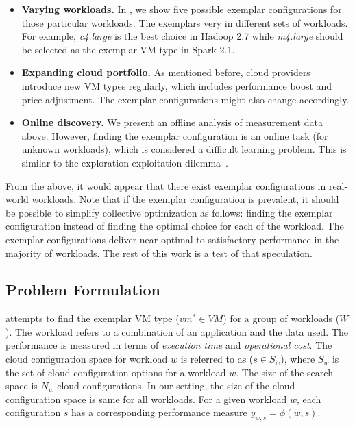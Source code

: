 \begin{itemize}
\item \textbf{Varying workloads.}
In \mytable{\ref{table:dataset}}, we show five possible exemplar configurations for those particular workloads.
The exemplars very in different sets of workloads.
For example, \emph{c4.large} is the best choice in Hadoop 2.7 while
\emph{m4.large} should be selected as the exemplar VM type in Spark 2.1.

\item \textbf{Expanding cloud portfolio.}
As mentioned before, cloud providers introduce new VM types regularly, which
includes performance boost and price adjustment.
The exemplar configurations might also change accordingly.

\item \textbf{Online discovery.}
We present an offline analysis of measurement data above.
However, finding the exemplar configuration is an online task (for unknown workloads), which is considered a difficult learning problem.
This is similar to the exploration-exploitation dilemma~\cite{kaelbling1996reinforcement}.

\end{itemize}

From the above, it would appear that there exist exemplar configurations in real-world workloads.
Note that if the exemplar configuration is prevalent, it should be possible to simplify collective optimization as follows:
finding the exemplar configuration instead of finding the optimal choice for each of the workload.
The exemplar configurations deliver near-optimal to satisfactory performance in the majority of workloads.
The rest of this work is a test of that speculation.






\subsection{Problem Formulation}
\label{sec:formulation}

\micky attempts to find the exemplar VM type ($vm^*\in VM$) for a group of workloads ($W$).
The workload refers to a combination of an application and the data used.
The performance is measured in terms of \textit{execution time} and \textit{operational cost}. The cloud configuration space for workload
$w$ is referred to as ($s\in S_w$), where $S_w$ is the set of cloud configuration options for a workload $w$. The size
of the search space is $N_w$ cloud configurations. In our setting, the size of the cloud configuration space is same for all workloads. For a given workload $w$, each configuration $s$ has a corresponding performance
measure $y_{w, s} = \phi(w, s)$.


